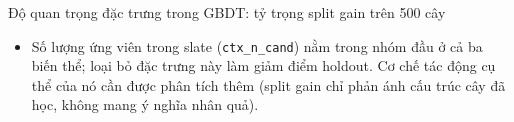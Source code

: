 \documentclass[aspectratio=169,t]{beamer}
\newcommand{\code}[1]{\texttt{#1}}
\begin{document}
\begin{frame}[shrink]{Độ quan trọng đặc trưng trong GBDT: tỷ trọng split gain trên 500 cây}
\begin{itemize}
  \item Số lượng ứng viên trong slate (\code{ctx\_n\_cand}) nằm trong nhóm đầu ở cả ba biến thể; loại bỏ đặc trưng này làm giảm điểm holdout. Cơ chế tác động cụ thể của nó cần được phân tích thêm (split gain chỉ phản ánh cấu trúc cây đã học, không mang ý nghĩa nhân quả).
\end{itemize}
\par\kern0pt%
\end{frame}

\end{document}
